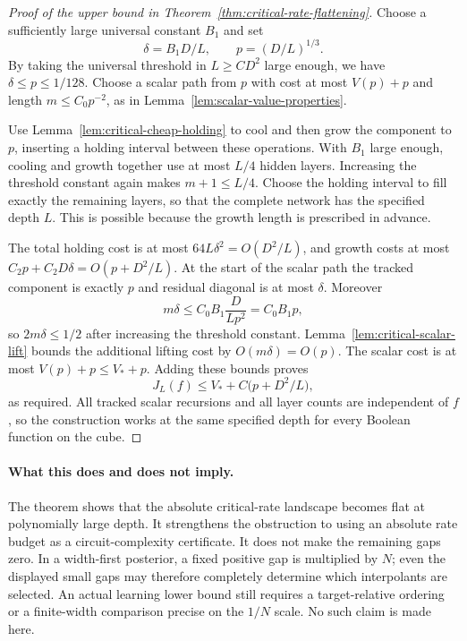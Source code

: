 \begin{proof}[Proof of the upper bound in Theorem~\ref{thm:critical-rate-flattening}]
Choose a sufficiently large universal constant $B_1$ and set
\[
 \delta=B_1D/L,\qquad p=(D/L)^{1/3}.
\]
By taking the universal threshold in $L\ge CD^2$ large enough, we have
$\delta\le p\le1/128$. Choose a scalar path from $p$ with cost at most
$V(p)+p$ and length $m\le C_0p^{-2}$, as in
Lemma~\ref{lem:scalar-value-properties}.

Use Lemma~\ref{lem:critical-cheap-holding} to cool and then grow the
component to $p$, inserting a holding interval between these operations.
With $B_1$ large enough, cooling and growth together use at most $L/4$
hidden layers. Increasing the threshold constant again makes
$m+1\le L/4$. Choose the holding interval to fill exactly the remaining
layers, so that the complete network has the specified depth $L$.
This is possible because the growth length is prescribed in advance.

The total holding cost is at most $64L\delta^2=O(D^2/L)$, and growth
costs at most $C_2p+C_2D\delta=O(p+D^2/L)$.
At the start of the scalar path the tracked component is exactly $p$
and residual diagonal is at most $\delta$.
Moreover
\[
 m\delta\le C_0B_1\frac{D}{Lp^2}=C_0B_1p,
\]
so $2m\delta\le1/2$ after increasing the threshold constant.
Lemma~\ref{lem:critical-scalar-lift} bounds the additional lifting cost
by $O(m\delta)=O(p)$. The scalar cost is at most $V(p)+p\le V_*+p$.
Adding these bounds proves
\[
 J_L(f)\le V_*+C\bigl(p+D^2/L\bigr),
\]
as required. All tracked scalar recursions and all layer counts are
independent of $f$, so the construction works at the same specified
depth for every Boolean function on the cube.
\end{proof}

\paragraph{What this does and does not imply.}
The theorem shows that the absolute critical-rate landscape becomes
flat at polynomially large depth. It strengthens the obstruction to
using an absolute rate budget as a circuit-complexity certificate.
It does not make the remaining gaps zero. In a width-first posterior,
a fixed positive gap is multiplied by $N$; even the displayed small
gaps may therefore completely determine which interpolants are selected.
An actual learning lower bound still requires a target-relative ordering
or a finite-width comparison precise on the $1/N$ scale. No such claim
is made here.
